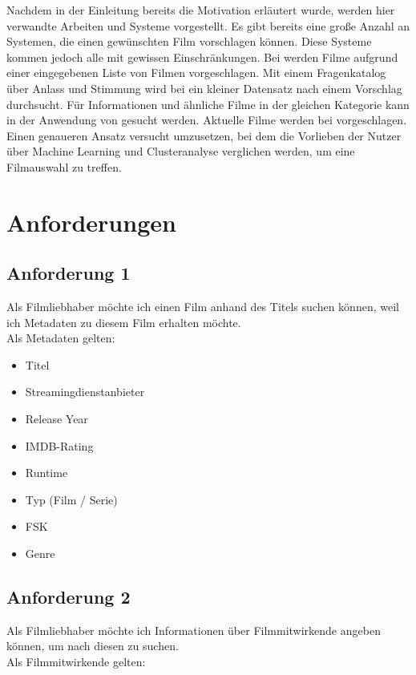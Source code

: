 \documentclass[conference]{IEEEtran}
\begin{document}
Nachdem in der Einleitung bereits die Motivation erläutert wurde, werden hier verwandte Arbeiten und Systeme vorgestellt.
Es gibt bereits eine große Anzahl an Systemen, die einen gewünschten Film vorschlagen können. Diese Systeme kommen jedoch alle mit gewissen Einschränkungen.
Bei \cite{cinemate} werden Filme aufgrund einer eingegebenen Liste von Filmen vorgeschlagen.
Mit einem Fragenkatalog über Anlass und Stimmung wird bei \cite{pickamovieforme} ein kleiner Datensatz nach einem Vorschlag durchsucht.
Für Informationen und ähnliche Filme in der gleichen Kategorie kann in der Anwendung von \cite{bestsimilar} gesucht werden.
Aktuelle Filme werden bei \cite{tastedive} vorgeschlagen.
Einen genaueren Ansatz versucht \cite{MovieGEN} umzusetzen, bei dem die Vorlieben der Nutzer über Machine Learning und Clusteranalyse verglichen werden, um eine Filmauswahl zu treffen.

\section{Anforderungen}

\subsection{Anforderung 1}
\label{1}
Als Filmliebhaber möchte ich einen Film anhand des Titels suchen können,
weil ich Metadaten zu diesem Film erhalten möchte.
\\
Als Metadaten gelten:
\begin{itemize}
        \item Titel
        \item Streamingdienstanbieter
        \item Release Year
        \item IMDB-Rating
        \item Runtime
        \item Typ (Film / Serie)
        \item FSK
        \item Genre
\end{itemize}


\subsection{Anforderung 2}
\label{2}
Als Filmliebhaber möchte ich Informationen über Filmmitwirkende angeben können,
um nach diesen zu suchen.
\\
Als Filmmitwirkende gelten:
\end{document}
